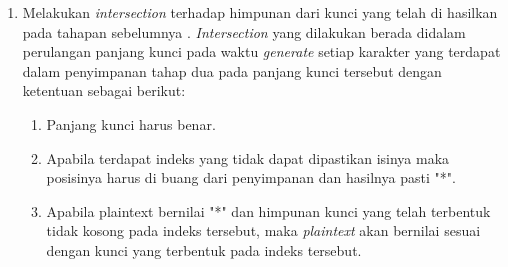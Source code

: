\begin{enumerate}
	\item Melakukan \textit{intersection} terhadap himpunan dari kunci yang telah di hasilkan pada tahapan sebelumnya  \cite{john_jones_spoj_2009}. \textit{Intersection} yang dilakukan berada didalam perulangan panjang kunci pada waktu \textit{generate} setiap karakter yang terdapat dalam penyimpanan tahap dua pada panjang kunci tersebut dengan ketentuan sebagai berikut:
	\begin{enumerate}
	\item Panjang kunci harus benar.
	\item Apabila terdapat indeks yang tidak dapat dipastikan isinya maka posisinya harus di buang dari penyimpanan dan hasilnya pasti "*".
	\item Apabila plaintext bernilai "*" dan himpunan kunci yang telah terbentuk tidak kosong pada indeks tersebut, maka \textit{plaintext} akan bernilai sesuai dengan kunci yang terbentuk pada indeks tersebut.
	\end{enumerate} 
\end{enumerate}	

	